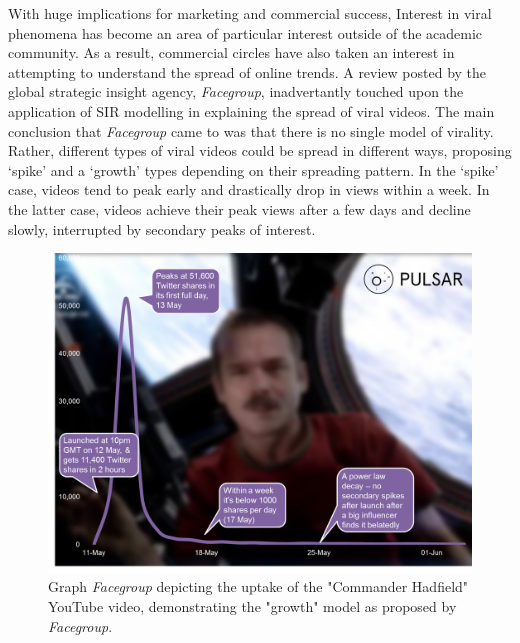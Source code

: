 \documentclass[11pt, a4paper, oneside,titlepage]{article}
\begin{document}
With huge implications for marketing and commercial success, Interest in viral phenomena has become an area of particular interest outside of the academic community. As a result, commercial circles have also taken an interest in attempting to understand the spread of online trends. A review posted by the global strategic insight agency, \emph{Facegroup}, inadvertantly touched upon the application of SIR modelling in explaining the spread of viral videos.\cite{facegroup} The main conclusion that  \emph{Facegroup} came to was that there is no single model of virality. Rather, different types of viral videos could be spread in different ways, proposing `spike' and a `growth' types depending on their spreading pattern. In the `spike' case, videos tend to peak early and drastically drop in views within a week. In the latter case, videos achieve their peak views after a few days and decline slowly, interrupted by secondary peaks of interest. 
\newpage
\begin{figure}[ht!]
\centering
\includegraphics[width=120mm]{hatfield.png}
\caption{Graph \emph{Facegroup} depicting the uptake of the "Commander Hadfield" YouTube video, demonstrating the "growth" model as proposed by \emph{Facegroup}.\cite{facegroup}}
\label{sir}
\end{figure}
\end{document}
